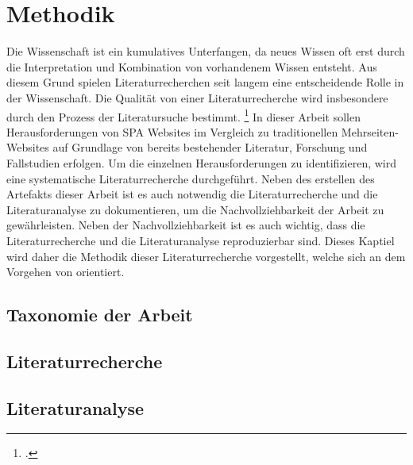 \section{Methodik}
Die Wissenschaft ist ein kumulatives Unterfangen, da neues Wissen oft erst durch die Interpretation und Kombination von vorhandenem Wissen entsteht. 
Aus diesem Grund spielen Literaturrecherchen seit langem eine entscheidende Rolle in der Wissenschaft. 
Die Qualität von einer Literaturrecherche wird insbesondere durch den Prozess der Literatursuche bestimmt.
\footcite{conf/ecis/BrockeSNRPC09}
In dieser Arbeit sollen Herausforderungen von \ac{SPA} Websites im Vergleich zu traditionellen Mehrseiten-Websites auf Grundlage von bereits bestehender Literatur, Forschung und Fallstudien erfolgen.
Um die einzelnen Herausforderungen zu identifizieren, wird eine systematische Literaturrecherche durchgeführt.
Neben des erstellen des Artefakts dieser Arbeit ist es auch notwendig die Literaturrecherche und die Literaturanalyse zu dokumentieren, um die Nachvollziehbarkeit der Arbeit zu gewährleisten.
Neben der Nachvollziehbarkeit ist es auch wichtig, dass die Literaturrecherche und die Literaturanalyse reproduzierbar sind. 
Dieses Kaptiel wird daher die Methodik dieser Literaturrecherche vorgestellt, welche sich an dem Vorgehen von \citeauthor{conf/ecis/BrockeSNRPC09} orientiert.
\subsection{Taxonomie der Arbeit}
\subsection{Literaturrecherche}
\subsection{Literaturanalyse}